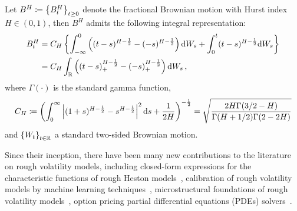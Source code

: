 \begin{definition}
Let $B^H\coloneqq\left\{B_t^H\right\}_{t \geq 0}$ denote the fractional Brownian motion with Hurst index $H \in(0,1)$, then $B^H$ admits the following integral representation:
\begin{align*}
B_t^H &= C_H\left\{\int_{-\infty}^0\left((t-s)^{H-\frac{1}{2}}-(-s)^{H-\frac{1}{2}}\right) \mathrm{d} W_s+\int_0^t(t-s)^{H-\frac{1}{2}} \mathrm{d} W_s\right\} \\
&= C_H \int_{\mathbb{R}}\left((t-s)_{+}^{H-\frac{1}{2}}-(-s)_{+}^{H-\frac{1}{2}}\right) \mathrm{d} W_s\,,
\end{align*}
where $\Gamma(\cdot)$ is the standard gamma function,
\[
C_H\coloneqq\left(\int_0^{\infty}\left\lvert(1+s)^{H-\frac{1}{2}}-s^{H-\frac{1}{2}}\right\rvert^2 \mathrm{d} s+\frac{1}{2 H}\right)^{-\frac{1}{2}}=\sqrt{\frac{2 H \Gamma(3 / 2-H)}{\Gamma(H+1 / 2) \Gamma(2-2 H)}}
\]
and $\left\{W_t\right\}_{t \in \mathbb{R}}$ a standard two-sided Brownian motion.
\end{definition}
Since their inception, there have been many new contributions to the literature on rough volatility models, including closed-form expressions for the characteristic functions of rough Heston models~\cite{Euch2018TheModels}, calibration of rough volatility models by machine learning techniques~\cite{Horvath2020DeepModels}, microstructural foundations of rough volatility models~\cite{Euch2018TheVolatility}, option pricing partial differential equations (PDEs) solvers~\cite{Jacquier2019DeepVolatility, Bayer2022PricingSPDEs}.



